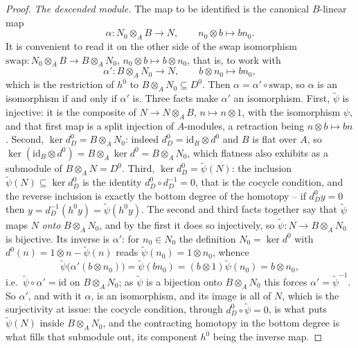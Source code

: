 \begin{proof}
\emph{The descended module.}  The map to be identified is the canonical
$B$-linear map
\[
\alpha:N_0\otimes_AB\longrightarrow N,\qquad
n_0\otimes b\longmapsto bn_0 .
\]
It is convenient to read it on the other side of the swap isomorphism
$\mathrm{swap}:N_0\otimes_AB\to B\otimes_AN_0$,
$n_0\otimes b\mapsto b\otimes n_0$, that is, to work with
\[
\alpha':B\otimes_AN_0\longrightarrow N,\qquad
b\otimes n_0\longmapsto bn_0,
\]
which is the restriction of $h^0$ to $B\otimes_AN_0\subseteq D^0$.
Then $\alpha=\alpha'\circ\mathrm{swap}$, so $\alpha$ is an isomorphism
if and only if $\alpha'$ is.  Three facts make $\alpha'$ an
isomorphism.  First, $\widetilde\psi$ is injective: it is the composite of
$N\to N\otimes_AB$, $n\mapsto n\otimes1$, with the isomorphism $\psi$,
and that first map is a split injection of $A$-modules, a retraction
being $n\otimes b\mapsto bn$.  Second, $\ker d^0_D=B\otimes_AN_0$:
indeed $d^0_D=\mathrm{id}_B\otimes d^0$ and $B$ is flat over $A$, so
$\ker(\mathrm{id}_B\otimes d^0)=B\otimes_A\ker d^0=B\otimes_AN_0$, which
flatness also exhibits as a submodule of $B\otimes_AN=D^0$.  Third,
$\ker d^0_D=\widetilde\psi(N)$: the inclusion
$\widetilde\psi(N)\subseteq\ker d^0_D$ is the identity
$d^0_D\circ d^{-1}_D=0$, that is the cocycle condition, and the reverse
inclusion is exactly the bottom degree of the homotopy -- if $d^0_Dy=0$
then $y=d^{-1}_D(h^0y)=\widetilde\psi(h^0y)$.  The second and third
facts together say that $\widetilde\psi$ maps $N$ \emph{onto}
$B\otimes_AN_0$, and by the first it does so injectively, so
$\widetilde\psi:N\to B\otimes_AN_0$ is bijective.  Its inverse is
$\alpha'$: for $n_0\in N_0$ the definition $N_0=\ker d^0$ with
$d^0(n)=1\otimes n-\widetilde\psi(n)$ reads
$\widetilde\psi(n_0)=1\otimes n_0$, whence
\[
\widetilde\psi\bigl(\alpha'(b\otimes n_0)\bigr)=\widetilde\psi(bn_0)
=(b\otimes1)\widetilde\psi(n_0)=b\otimes n_0,
\]
i.e.\ $\widetilde\psi\circ\alpha'=\mathrm{id}$ on $B\otimes_AN_0$; as
$\widetilde\psi$ is a bijection onto $B\otimes_AN_0$ this forces
$\alpha'=\widetilde\psi^{-1}$.  So $\alpha'$, and with it $\alpha$, is
an isomorphism, and its image is all of $N$, which is the surjectivity
at issue: the cocycle condition, through
$d^0_D\circ\widetilde\psi=0$, is what puts
$\widetilde\psi(N)$ inside $B\otimes_AN_0$, and the contracting homotopy
in the bottom degree is what fills that submodule out, its component
$h^0$ being the inverse map.


\end{proof}
